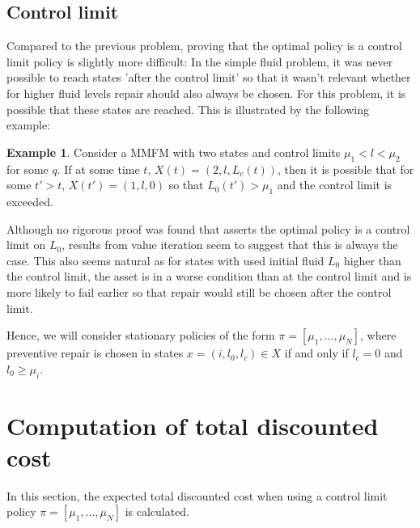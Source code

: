 \documentclass[a4paper]{thesis}
\theoremstyle{definition}
\newtheorem{example}{Example}[chapter]
\begin{document}
\subsection{Control limit}
Compared to the previous problem, proving that the optimal policy is a control limit policy is slightly more difficult:
In the simple fluid problem, it was never possible to reach states 'after the control limit' so that it wasn't relevant whether for higher fluid levels repair should also always be chosen.
For this problem, it is possible that these states are reached.
This is illustrated by the following example:
\begin{example}
	Consider a MMFM with two states and control limits $\mu_1<l<\mu_2$ for some $q$.
	If at some time $t$, $X(t)=(2,l,L_c(t))$, then it is possible that for some $t'>t$, $X(t')=(1,l,0)$ so that $L_0(t')>\mu_1$ and the control limit is exceeded.
\end{example}
Although no rigorous proof was found that asserts the optimal policy is a control limit on $L_0$, results from value iteration seem to suggest that this is always the case.
This also seems natural as for states with used initial fluid $L_0$ higher than the control limit, the asset is in a worse condition than at the control limit and is more likely to fail earlier so that repair would still be chosen after the control limit.

Hence, we will consider stationary policies of the form $\pi=[\mu_1,...,\mu_N]$, where preventive repair is chosen in states $x=(i,l_0,l_c)\in X$ if and only if $l_c=0$ and $l_0\geq \mu_i$. \section{Computation of total discounted cost}
In this section, the expected total discounted cost when using a control limit policy $\pi=[\mu_1,...,\mu_N]$ is calculated.
\end{document}
